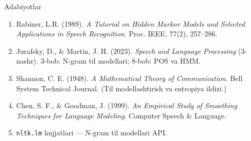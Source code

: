 \documentclass[aspectratio=169,11pt]{beamer}
\begin{document}
\begin{frame}{Adabiyotlar}
\scriptsize

\begin{enumerate}\setlength\itemsep{6pt}
  \item Rabiner, L.R. (1989). \textit{A Tutorial on Hidden Markov Models and Selected
        Applications in Speech Recognition}. Proc. IEEE, 77(2), 257--286.

  \item Jurafsky, D., \& Martin, J. H. (2023).
        \textit{Speech and Language Processing} (3-nashr).
        3-bob: N-gram til modellari; 8-bob: POS va HMM.

  \item Shannon, C. E. (1948).
        \textit{A Mathematical Theory of Communication}.
        Bell System Technical Journal. (Til modellashtirish va entropiya ildizi.)

  \item Chen, S. F., \& Goodman, J. (1999).
        \textit{An Empirical Study of Smoothing Techniques for Language Modeling}.
        Computer Speech \& Language.

  \item \texttt{nltk.lm} hujjatlari --- N-gram til modellari API.
\end{enumerate}

\end{frame}

\appendix
\end{document}

